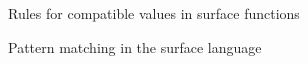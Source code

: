 \begin{figure}
    {\small \flushleft {} %
    }
    \caption{Rules for compatible values in surface functions}
\end{figure}
\begin{figure}
    {\small \flushleft \shadebox{}
    \begin{smathpar}
        
    \end{smathpar}}
\caption{Pattern matching in the surface language}
\end{figure}